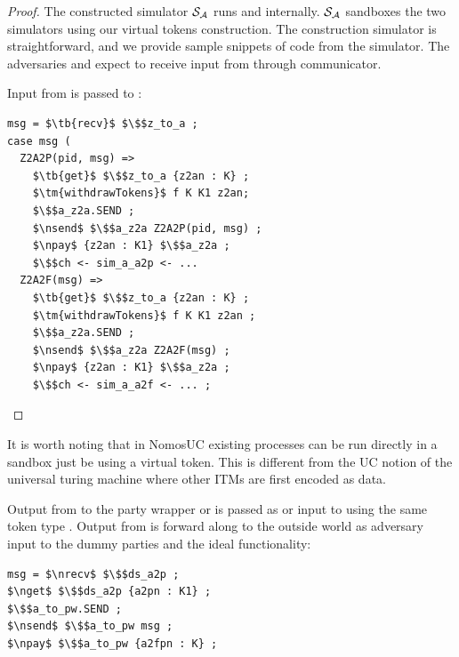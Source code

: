 \begin{proof}
The constructed simulator $\mathcal{S}_\mathcal{A}$ runs \A and \DS internally.
$\mathcal{S}_\mathcal{A}$ sandboxes the two simulators using our virtual tokens construction.
The construction simulator is straightforward, and we provide sample snippets of code from the simulator.
The adversaries \A and \DS expect to receive input from \Z through communicator.

Input from \Z is passed to \A:
\begin{lstlisting}[basicstyle=\footnotesize\BeraMonottFamily, frame=single,  mathescape]
msg = $\tb{recv}$ $\$$z_to_a ;
case msg (
  Z2A2P(pid, msg) =>
    $\tb{get}$ $\$$z_to_a {z2an : K} ;
    $\tm{withdrawTokens}$ f K K1 z2an;
    $\$$a_z2a.SEND ;
    $\nsend$ $\$$a_z2a Z2A2P(pid, msg) ;
    $\npay$ {z2an : K1} $\$$a_z2a ;
    $\$$ch <- sim_a_a2p <- ... 
  Z2A2F(msg) =>
    $\tb{get}$ $\$$z_to_a {z2an : K} ;
    $\tm{withdrawTokens}$ f K K1 z2an ;
    $\$$a_z2a.SEND ;
    $\nsend$ $\$$a_z2a Z2A2F(msg) ;
    $\npay$ {z2an : K1} $\$$a_z2a ;
    $\$$ch <- sim_a_a2f <- ... ;
\end{lstlisting}
\end{proof}
It is worth noting that in NomosUC existing processes can be run directly in a sandbox just be using a virtual token.
This is different from the UC notion of the universal turing machine where other ITMs are first encoded as data.

Output from \A to the party wrapper or \F is passed as  or  input to \DS using the same token type .
Output from \DS is forward along to the outside world as adversary input to the dummy parties and the ideal functionality:
\begin{lstlisting}[basicstyle=\footnotesize\BeraMonottFamily, frame=single, mathescape]
msg = $\nrecv$ $\$$ds_a2p ;
$\nget$ $\$$ds_a2p {a2pn : K1} ;
$\$$a_to_pw.SEND ;
$\nsend$ $\$$a_to_pw msg ;
$\npay$ $\$$a_to_pw {a2fpn : K} ;
\end{lstlisting}
